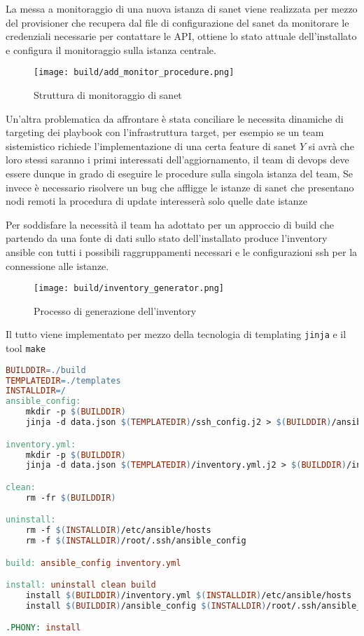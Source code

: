 La messa a monitoraggio di una nuova istanza di sanet viene realizzata per mezzo del provisioner che recupera dal file di configurazione del sanet da monitorare le credenziali necessarie per contattare le API, ottiene lo stato attuale dell'installato e configura il monitoraggio sulla istanza centrale.

\begin{figure}[H]
    \centering
    \texttt{[image: build/add\_monitor\_procedure.png]}
    \caption{Struttura di monitoraggio di sanet}
    \label{fig:add_monitor_procedure}
\end{figure}

Un'altra problematica da affrontare è stata conciliare le necessita dinamiche di targeting dei playbook con l'infrastruttura target, per esempio se un team sistemistico richiede l'implementazione di una certa feature di sanet \(Y\) si avrà che loro stessi saranno i primi interessati dell'aggiornamento, il team di devops deve essere dunque in grado di eseguire le procedure sulla singola istanza del team, Se invece è necessario risolvere un bug che affligge le istanze di sanet che presentano nodi remoti la procedura di update interesserà solo quelle date istanze

Per soddisfare la necessità il team ha adottato per un approccio di build che partendo da una fonte di dati sullo stato dell'installato produce l'inventory ansible con tutti i possibili raggruppamenti necessari e le configurazioni ssh per la connessione alle istanze.

\begin{figure}[H]
    \centering
    \texttt{[image: build/inventory\_generator.png]}
    \caption{Processo di generazione dell'inventory}
    \label{fig:inventory_generator}
\end{figure}

Il tutto viene implementato per mezzo della tecnologia di templating \verb|jinja| e il tool \verb|make|

\begin{lstlisting}[language=make]
BUILDDIR=./build
TEMPLATEDIR=./templates
INSTALLDIR=/
ansible_config:
	mkdir -p $(BUILDDIR)
	jinja -d data.json $(TEMPLATEDIR)/ssh_config.j2 > $(BUILDDIR)/ansible_config

inventory.yml:
	mkdir -p $(BUILDDIR)
	jinja -d data.json $(TEMPLATEDIR)/inventory.yml.j2 > $(BUILDDIR)/inventory.yml

clean:
	rm -fr $(BUILDDIR)

uninstall:
	rm -f $(INSTALLDIR)/etc/ansible/hosts
	rm -f $(INSTALLDIR)/root/.ssh/ansible_config

build: ansible_config inventory.yml

install: uninstall clean build
	install $(BUILDDIR)/inventory.yml $(INSTALLDIR)/etc/ansible/hosts
	install $(BUILDDIR)/ansible_config $(INSTALLDIR)/root/.ssh/ansible_config

.PHONY: install
\end{lstlisting}
